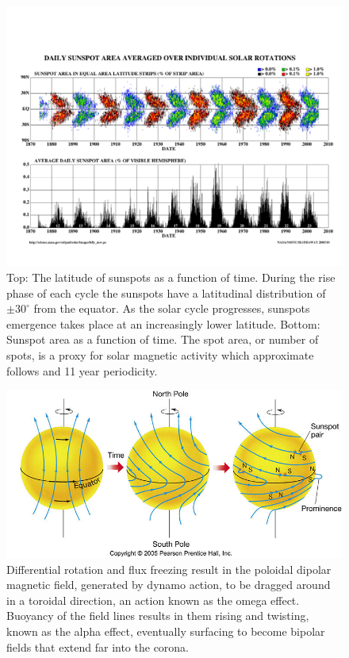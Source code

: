 \begin{figure}[!t]
\begin{center}
\includegraphics[scale=0.55, trim =1cm 2cm 0cm 3cm]{images/bfly_new.pdf}
\caption[The solar butterfly diagram]{Top: The latitude of sunspots as a function of time. During the rise phase of each cycle the sunspots have a latitudinal distribution of $\pm30^{\circ}$ from the equator.  As the solar cycle progresses, sunspots emergence takes place at an increasingly lower latitude. Bottom: Sunspot area as a function of time. The spot area, or number of spots, is a proxy for solar magnetic activity which approximate follows and 11 year periodicity.}
\label{fig:butterfly} 
\end{center}
\end{figure}
\begin{figure}[!h]
\begin{center}
\includegraphics[]{images/Babcock}
\caption[The Babcock model of magnetic field evolution in the Sun]{Differential rotation and flux freezing result in the poloidal dipolar magnetic field, generated by dynamo action, to be dragged around in a toroidal direction, an action known as the omega effect. Buoyancy of the field lines results in them rising and twisting, known as the alpha effect, eventually surfacing to become bipolar fields that extend far into the corona.}
\label{fig:Babcock} 
\end{center}
\end{figure}


